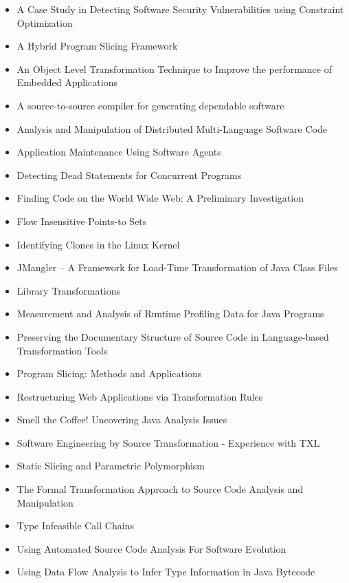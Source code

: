 {\small
\begin{itemize}[itemsep=-1ex]
  \item A Case Study in Detecting Software Security Vulnerabilities using Constraint Optimization
  \item A Hybrid Program Slicing Framework
  \item An Object Level Transformation Technique to Improve the performance of Embedded Applications
  \item A source-to-source compiler for generating dependable software
  \item Analysis and Manipulation of Distributed Multi-Language Software Code
  \item Application Maintenance Using Software Agents
  \item Detecting Dead Statements for Concurrent Programs
  \item Finding Code on the World Wide Web: A Preliminary Investigation
  \item Flow Insensitive Points-to Sets
  \item Identifying Clones in the Linux Kernel
  \item JMangler – A Framework for Load-Time Transformation of Java Class Files
  \item Library Transformations
  \item Measurement and Analysis of Runtime Profiling Data for Java Programs
  \item Preserving the Documentary Structure of Source Code in Language-based Transformation Tools
  \item Program Slicing: Methods and Applications
  \item Restructuring Web Applications via Transformation Rules
  \item Smell the Coffee! Uncovering Java Analysis Issues
  \item Software Engineering by Source Transformation - Experience with TXL
  \item Static Slicing and Parametric Polymorphism
  \item The Formal Transformation Approach to Source Code Analysis and Manipulation
  \item Type Infeasible Call Chains
  \item Using Automated Source Code Analysis For Software Evolution
  \item Using Data Flow Analysis to Infer Type Information in Java Bytecode
\end{itemize}
}

